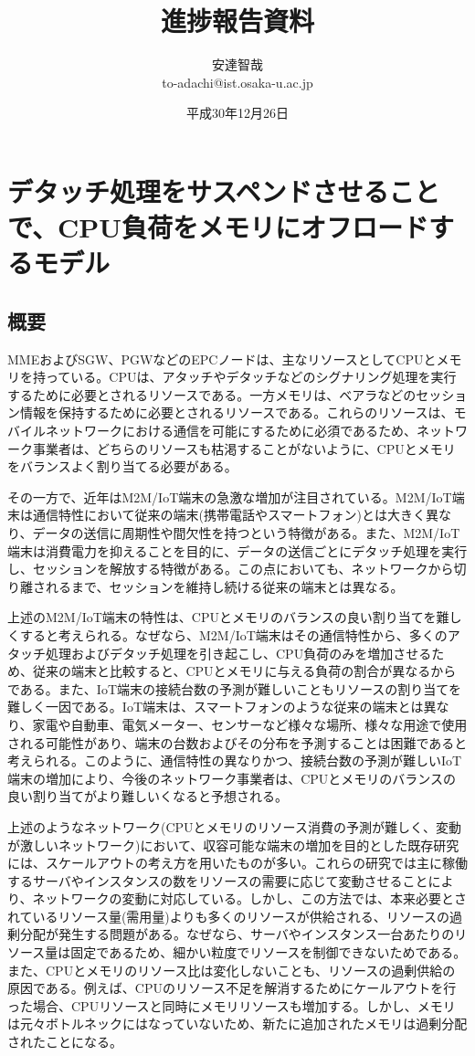 \documentclass[a4j]{ujarticle}
\title{進捗報告資料}
\author{安達智哉\\to-adachi@ist.osaka-u.ac.jp}
\date{平成30年12月26日}
\begin{document}
\maketitle

\section{デタッチ処理をサスペンドさせることで、CPU負荷をメモリにオフロードするモデル}

\subsection{概要}
MMEおよびSGW、PGWなどのEPCノードは、主なリソースとしてCPUとメモリを持っている。CPUは、アタッチやデタッチなどのシグナリング処理を実行するために必要とされるリソースである。一方メモリは、ベアラなどのセッション情報を保持するために必要とされるリソースである。これらのリソースは、モバイルネットワークにおける通信を可能にするために必須であるため、ネットワーク事業者は、どちらのリソースも枯渇することがないように、CPUとメモリをバランスよく割り当てる必要がある。

その一方で、近年はM2M/IoT端末の急激な増加が注目されている。M2M/IoT端末は通信特性において従来の端末(携帯電話やスマートフォン)とは大きく異なり、データの送信に周期性や間欠性を持つという特徴がある。また、M2M/IoT端末は消費電力を抑えることを目的に、データの送信ごとにデタッチ処理を実行し、セッションを解放する特徴がある。この点においても、ネットワークから切り離されるまで、セッションを維持し続ける従来の端末とは異なる。

上述のM2M/IoT端末の特性は、CPUとメモリのバランスの良い割り当てを難しくすると考えられる。なぜなら、M2M/IoT端末はその通信特性から、多くのアタッチ処理およびデタッチ処理を引き起こし、CPU負荷のみを増加させるため、従来の端末と比較すると、CPUとメモリに与える負荷の割合が異なるからである。また、IoT端末の接続台数の予測が難しいこともリソースの割り当てを難しく一因である。IoT端末は、スマートフォンのような従来の端末とは異なり、家電や自動車、電気メーター、センサーなど様々な場所、様々な用途で使用される可能性があり、端末の台数およびその分布を予測することは困難であると考えられる。このように、通信特性の異なりかつ、接続台数の予測が難しいIoT端末の増加により、今後のネットワーク事業者は、CPUとメモリのバランスの良い割り当てがより難しいくなると予想される。

上述のようなネットワーク(CPUとメモリのリソース消費の予測が難しく、変動が激しいネットワーク)において、収容可能な端末の増加を目的とした既存研究には、スケールアウトの考え方を用いたものが多い。これらの研究では主に稼働するサーバやインスタンスの数をリソースの需要に応じて変動させることにより、ネットワークの変動に対応している。しかし、この方法では、本来必要とされているリソース量(需用量)よりも多くのリソースが供給される、リソースの過剰分配が発生する問題がある。なぜなら、サーバやインスタンス一台あたりのリソース量は固定であるため、細かい粒度でリソースを制御できないためである。また、CPUとメモリのリソース比は変化しないことも、リソースの過剰供給の原因である。例えば、CPUのリソース不足を解消するためにケールアウトを行った場合、CPUリソースと同時にメモリリソースも増加する。しかし、メモリは元々ボトルネックにはなっていないため、新たに追加されたメモリは過剰分配されたことになる。
\end{document}
